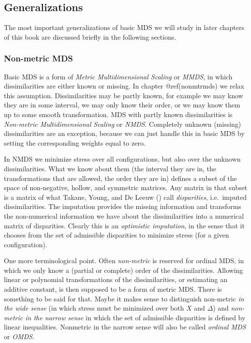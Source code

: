 \documentclass[
  12pt,
  letterpaper,
  DIV=11,
  numbers=noendperiod]{scrartcl}
\begin{document}
\subsection{Generalizations}\label{introgeneralize}

The most important generalizations of basic MDS we will study in later
chapters of this book are discussed briefly in the following sections.

\subsubsection{Non-metric MDS}\label{gennonmetric}

Basic MDS is a form of \emph{Metric Multidimensional Scaling} or
\emph{MMDS}, in which dissimilarities are either known or missing. In
chapter @ref(nonmtrmds) we relax this assumption. Dissimilarities may be
partly known, for example we may know they are in some interval, we may
only know their order, or we may know them up to some smooth
transformation. MDS with partly known dissimilarities is
\emph{Non-metric Multidimensional Scaling} or \emph{NMDS}. Completely
unknown (missing) dissimilarities are an exception, because we can just
handle this in basic MDS by setting the corresponding weights equal to
zero.

In NMDS we minimize stress over all configurations, but also over the
unknown dissimilarities. What we know about them (the interval they are
in, the transformations that are allowed, the order they are in) defines
a subset of the space of non-negative, hollow, and symmetric matrices.
Any matrix in that subset is a matrix of what Takane, Young, and De
Leeuw () call
\emph{disparities}, i.e.~imputed dissimilarities. The imputation
provides the missing information and transforms the non-numerical
information we have about the dissimilarities into a numerical matrix of
disparities. Clearly this is an \emph{optimistic imputation}, in the
sense that it chooses from the set of admissible disparities to minimize
stress (for a given configuration).

One more terminological point. Often \emph{non-metric} is reserved for
ordinal MDS, in which we only know a (partial or complete) order of the
dissimilarities. Allowing linear or polynomial transformations of the
dissimilarities, or estimating an additive constant, is then supposed to
be a form of metric MDS. There is something to be said for that. Maybe
it makes sense to distinguish non-metric \emph{in the wide sense} (in
which stress must be minimized over both \(X\) and \(\Delta\)) and
\emph{non-metric in the narrow sense} in which the set of admissible
disparities is defined by linear inequalities. Nonmetric in the narrow
sense will also be called \emph{ordinal MDS} or \emph{OMDS}.
\end{document}

